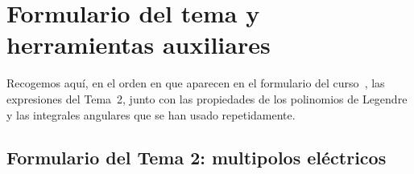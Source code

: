 \clearpage
\appendix
\section{Formulario del tema y herramientas auxiliares}\label{app:formulario}
Recogemos aquí, en el orden en que aparecen en el formulario del curso~\cite{FORMULARIO}, las expresiones del Tema~2, junto con las propiedades de los polinomios de
Legendre y las integrales angulares que se han usado repetidamente.

\subsection{Formulario del Tema 2: multipolos eléctricos}\label{app:tabla}
